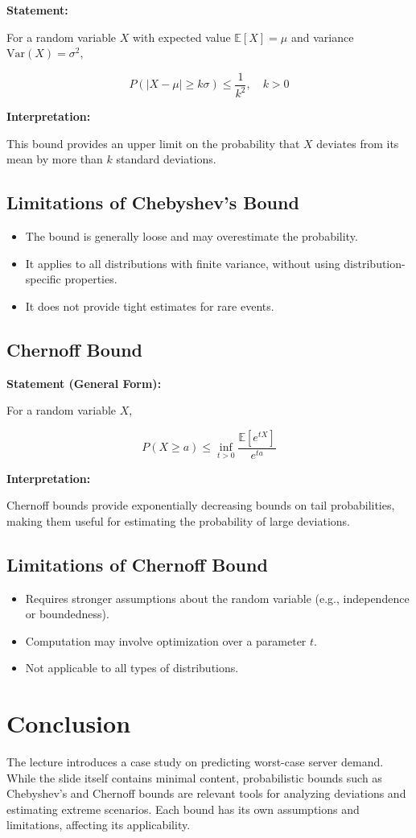 \documentclass[12pt]{article}
\begin{document}
\textbf{Statement:}

For a random variable $X$ with expected value $\mathbb{E}[X] = \mu$ and variance $\mathrm{Var}(X) = \sigma^2$,

\[
P(|X - \mu| \geq k\sigma) \leq \frac{1}{k^2}, \quad k > 0
\]

\textbf{Interpretation:}

This bound provides an upper limit on the probability that $X$ deviates from its mean by more than $k$ standard deviations.

\subsection*{Limitations of Chebyshev's Bound}

\begin{itemize}
    \item The bound is generally loose and may overestimate the probability.
    \item It applies to all distributions with finite variance, without using distribution-specific properties.
    \item It does not provide tight estimates for rare events.
\end{itemize}

\subsection*{Chernoff Bound}

\textbf{Statement (General Form):}

For a random variable $X$,

\[
P(X \geq a) \leq \inf_{t > 0} \frac{\mathbb{E}[e^{tX}]}{e^{ta}}
\]

\textbf{Interpretation:}

Chernoff bounds provide exponentially decreasing bounds on tail probabilities, making them useful for estimating the probability of large deviations.

\subsection*{Limitations of Chernoff Bound}

\begin{itemize}
    \item Requires stronger assumptions about the random variable (e.g., independence or boundedness).
    \item Computation may involve optimization over a parameter $t$.
    \item Not applicable to all types of distributions.
\end{itemize}

\section*{Conclusion}

The lecture introduces a case study on predicting worst-case server demand. While the slide itself contains minimal content, probabilistic bounds such as Chebyshev's and Chernoff bounds are relevant tools for analyzing deviations and estimating extreme scenarios. Each bound has its own assumptions and limitations, affecting its applicability.
\end{document}
